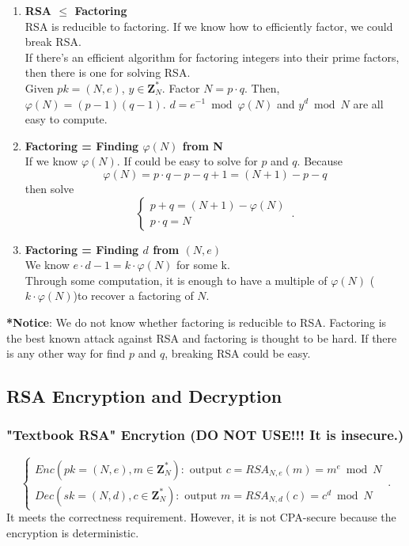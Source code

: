 \documentclass{scribe}
\begin{document}
\begin{enumerate}
    \item \textbf{RSA $\le$ Factoring}\\
            RSA is reducible to factoring. If we know how to efficiently factor, we could break RSA.\\
            If there's an efficient algorithm for factoring integers into their prime factors, then there is one for solving RSA.\\
            Given $pk = (N,e)$, $y \in \mathbf{Z}_N^*$. Factor $N=p \cdot q$. Then, $\varphi(N) = (p-1)(q-1)$. $d = e^{-1} \bmod \varphi(N)$ and $y^d \bmod N$ are all easy to compute.
    \item \textbf{Factoring = Finding $\varphi(N)$ from N}\\
            If we know $\varphi(N)$. If could be easy to solve for $p$ and $q$. Because
            \[\varphi(N) = p \cdot q - p - q +1 = (N+1) -p - q \]
            then solve 
            \begin{equation*}
                \begin{cases}
                  p+q = (N+1) - \varphi(N)\\
                  p \cdot q = N
                \end{cases}\,.
            \end{equation*}
    \item \textbf{Factoring = Finding $d$ from $(N,e)$}\\
            We know $e \cdot d - 1 = k \cdot \varphi(N)$ for some k.\\
            Through some computation, it is enough to have a multiple of $\varphi(N)$ ($k \cdot \varphi(N)$)to recover a factoring of $N$.
\end{enumerate}
\textbf{*Notice}: We do not know whether factoring is reducible to RSA. Factoring is the best known attack against RSA and factoring is thought to be hard. If there is any other way for find $p$ and $q$, breaking RSA could be easy.
\vspace{5mm}
\subsection{RSA Encryption and Decryption}
\subsubsection{"Textbook RSA" Encrytion (DO NOT USE!!! It is insecure.)}
\begin{equation*}
    \begin{cases}
      Enc(pk = (N, e), m \in \mathbf{Z}_N^*): \text{ output } c= RSA_{N,e}(m) = m^e \bmod N \\
      Dec(sk = (N, d), c \in \mathbf{Z}_N^*): \text{ output } m = RSA_{N,d}(c) = c^d \bmod N
    \end{cases}\,.
\end{equation*}
It meets the correctness requirement. However, it is not CPA-secure because the encryption is deterministic.
\end{document}

